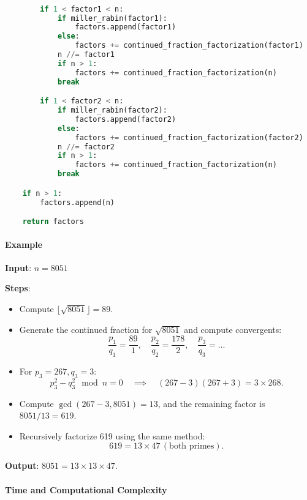 \documentclass[12pt]{report}
\begin{document}
\clearpage

\begin{lstlisting}[language=Python]

        if 1 < factor1 < n:
            if miller_rabin(factor1):
                factors.append(factor1)
            else:
                factors += continued_fraction_factorization(factor1)
            n //= factor1
            if n > 1:
                factors += continued_fraction_factorization(n)
            break

        if 1 < factor2 < n:
            if miller_rabin(factor2):
                factors.append(factor2)
            else:
                factors += continued_fraction_factorization(factor2)
            n //= factor2
            if n > 1:
                factors += continued_fraction_factorization(n)
            break

    if n > 1:
        factors.append(n)

    return factors
\end{lstlisting}

\paragraph{Example}

\textbf{Input}: $n = 8051$

\textbf{Steps}:
\begin{itemize}
    \item Compute $\lfloor \sqrt{8051} \rfloor = 89$.
    \item Generate the continued fraction for $\sqrt{8051}$ and compute convergents:
\[
    \frac{p_1}{q_1} = \frac{89}{1}, \quad \frac{p_2}{q_2} = \frac{178}{2}, \quad \frac{p_3}{q_3} = \ldots
\]
    \item For $p_3 = 267, q_3 = 3$:
\[
    p_3^2 - q_3^2 \mod n = 0 \quad \implies \quad (267 - 3)(267 + 3) = 3 \times 268.
\]
    \item Compute $\gcd(267 - 3, 8051) = 13$, and the remaining factor is $8051 / 13 = 619$.
    \item Recursively factorize 619 using the same method:
\[
    619 = 13 \times 47 \, (\text{both primes}).
\]
\end{itemize}

\textbf{Output}: $8051 = 13 \times 13 \times 47$.

\paragraph{Time and Computational Complexity}
\end{document}
